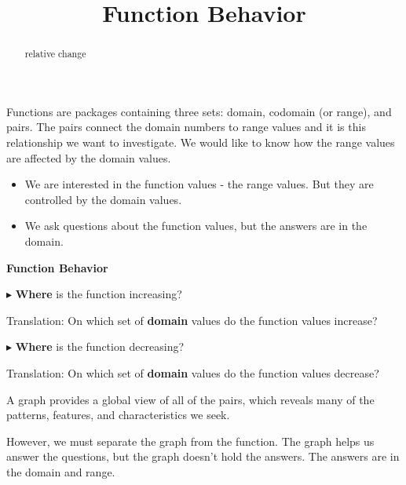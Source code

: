 \documentclass{ximera}
\title{Function Behavior}
\begin{document}
\begin{abstract}
relative change
\end{abstract}
\maketitle





Functions are packages containing three sets: domain, codomain (or range), and pairs.  The pairs connect the domain numbers to range values and it is this relationship we want to investigate.   We would like to know how the range values are affected by the domain values.  



\begin{itemize}
\item We are interested in the function values - the range values.  But they are controlled by the domain values. 
\item We ask questions about the function values, but the answers are in the domain.
\end{itemize}




\begin{idea} \textbf{\textcolor{blue!55!black}{Function Behavior}} 

$\blacktriangleright$ \textbf{\textcolor{purple!85!blue}{Where}} is the function increasing? 

Translation: On which set of \textbf{\textcolor{purple!85!blue}{domain}} values do the function values increase? 


$\blacktriangleright$ \textbf{\textcolor{purple!85!blue}{Where}} is the function decreasing? 

Translation: On which set of \textbf{\textcolor{purple!85!blue}{domain}} values do the function values decrease? 


\end{idea}








A graph provides a global view of all of the pairs, which reveals many of the patterns, features, and characteristics we seek.   

However, we must separate the graph from the function.  The graph helps us answer the questions, but the graph doesn't hold the answers.  The answers are in the domain and range. 
\end{document}
